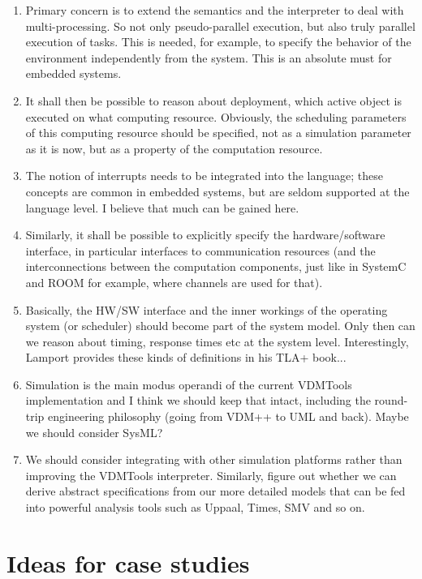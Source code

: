 \documentclass{llncs}
\begin{document}

\begin{enumerate}
\item Primary concern is to extend the semantics and the interpreter
to deal with multi-processing. So not only pseudo-parallel execution,
but also truly parallel execution of tasks. This is needed, for example,
to specify the behavior of the environment independently from the system.
This is an absolute must for embedded systems.
\item It shall then be possible to reason about deployment, which
active object is executed on what computing resource. Obviously, the
scheduling parameters of this computing resource should be specified,
not as a simulation parameter as it is now, but as a property of the
computation resource.
\item The notion of interrupts needs to be integrated into the language;
these concepts are common in embedded systems, but are seldom supported
at the language level. I believe that much can be gained here.
\item Similarly, it shall be possible to explicitly specify the
hardware/software interface, in particular interfaces to communication
resources (and the interconnections between the computation components,
just like in SystemC and ROOM for example, where channels are used for
that).
\item Basically, the HW/SW interface and the inner workings of the
operating system (or scheduler) should become part of the system model.
Only then can we reason about timing, response times etc at the system
level. Interestingly, Lamport provides these kinds of definitions in
his TLA+ book...
\item Simulation is the main modus operandi of the current VDMTools
implementation and I think we should keep that intact, including the
round-trip engineering philosophy (going from VDM++ to UML and back).
Maybe we should consider SysML?
\item We should consider integrating with other simulation platforms
rather than improving the VDMTools interpreter. Similarly, figure out
whether we can derive abstract specifications from our more detailed
models that can be fed into powerful analysis tools such as Uppaal,
Times, SMV and so on.
\end{enumerate}

\section{Ideas for case studies}
\end{document}
